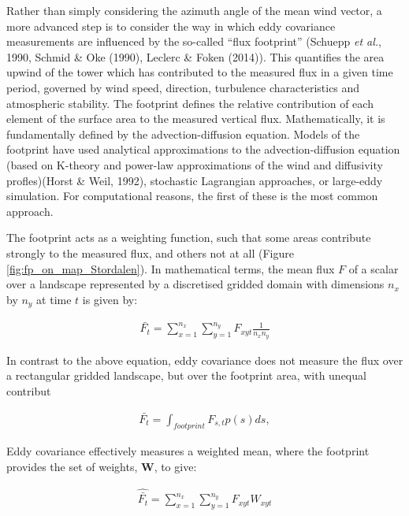 Rather than simply considering the azimuth angle of the mean wind
vector, a more advanced step is to consider the way in which eddy
covariance measurements are influenced by the so-called ``flux
footprint'' (Schuepp \emph{et al.}, 1990, Schmid \& Oke (1990), Leclerc
\& Foken (2014)). This quantifies the area upwind of the tower which has
contributed to the measured flux in a given time period, governed by
wind speed, direction, turbulence characteristics and atmospheric
stability. The footprint defines the relative contribution of each
element of the surface area to the measured vertical flux.
Mathematically, it is fundamentally defined by the advection-diffusion
equation. Models of the footprint have used analytical approximations to
the advection-diffusion equation (based on K-theory and power-law
approximations of the wind and diffusivity profles)(Horst \& Weil,
1992), stochastic Lagrangian approaches, or large-eddy simulation. For
computational reasons, the first of these is the most common approach.

The footprint acts as a weighting function, such that some areas
contribute strongly to the measured flux, and others not at all (Figure
\ref{fig:fp_on_map_Stordalen}). In mathematical terms, the mean flux
\(F\) of a scalar over a landscape represented by a discretised gridded
domain with dimensions \(n_x\) by \(n_y\) at time \(t\) is given by:

\begin{align}   \label{eq:simpleMean}
  \bar{F_t} = \sum_{x = 1}^{n_x} \sum_{y = 1}^{n_y} F_{xyt} \frac{1}{n_x n_y}
\end{align}

In contrast to the above equation, eddy covariance does not measure the flux over a rectangular gridded landscape, but over the footprint area, with unequal contribut

\begin{align}   \label{eq:simpleMean}
  \bar{F_t} = \int_{footprint} F_{s,t} p(s) d s,
\end{align}



Eddy covariance effectively measures a weighted mean, where the
footprint provides the set of weights, \(\mathbf{W}\), to give:

\begin{align}   \label{eq:weightMean}
  \widehat{\bar{F_t}} = \sum_{x = 1}^{n_x} \sum_{y = 1}^{n_y} F_{xyt} W_{xyt}
\end{align}

